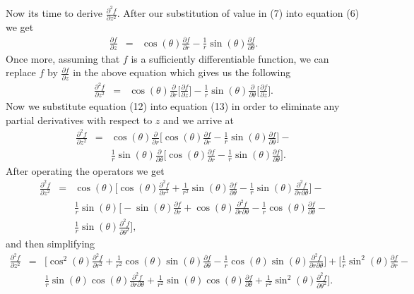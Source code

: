 \documentclass[12pt]{article}
\begin{document}
Now its time to derive $\frac{{\partial}^2 f}{\partial z^2}$. After our substitution of value in (7) into equation (6) we get
\begin{eqnarray}
\frac{\partial f}{\partial z} &=& \cos(\theta)\frac{\partial f}{\partial r} - \frac{1}{r}\sin(\theta)\frac{\partial f}{\partial\theta}.
\end{eqnarray}
Once more, assuming that $f$ is a sufficiently differentiable function, we can replace $f$ by $\frac{\partial f}{\partial z}$ in the above equation which gives us the following 
\begin{eqnarray}
\frac{{\partial}^2 f}{\partial z^2} &=& \cos(\theta)\frac{\partial}{\partial r}\Big[\frac{\partial f}{\partial z}\Big] - \frac{1}{r}\sin(\theta)\frac{\partial}{\partial\theta}\Big[\frac{\partial f}{\partial z}\Big].
\end{eqnarray}
Now we substitute equation (12) into equation (13) in order to eliminate any partial derivatives with respect to $z$ and we arrive at
\begin{eqnarray*}
\frac{{\partial}^2 f}{\partial z^2} &=& \cos(\theta)\frac{\partial}{\partial r}\Big[\cos(\theta)\frac{\partial f}{\partial r} - \frac{1}{r}\sin(\theta)\frac{\partial f}{\partial\theta}\Big] - \\
& & \frac{1}{r}\sin(\theta)\frac{\partial}{\partial\theta}\Big[\cos(\theta)\frac{\partial f}{\partial r} - \frac{1}{r}\sin(\theta)\frac{\partial f}{\partial\theta}\Big].
\end{eqnarray*}
After operating the operators we get
\begin{eqnarray*}
\frac{{\partial}^2 f}{\partial z^2} &=& \cos(\theta)\Big[\cos(\theta)\frac{{\partial}^2 f}{\partial r^2} + \frac{1}{r^2}\sin(\theta)\frac{\partial f}{\partial\theta} - \frac{1}{r}\sin(\theta)\frac{{\partial}^2 f}{\partial r \partial\theta}\Big] - \\
& & \frac{1}{r}\sin(\theta)\Big[-\sin(\theta)\frac{\partial f}{\partial r} + \cos(\theta)\frac{{\partial}^2 f}{\partial r \partial\theta} - \frac{1}{r}\cos(\theta)\frac{\partial f}{\partial\theta} - \\
& & \frac{1}{r}\sin(\theta)\frac{{\partial}^2 f}{\partial{\theta}^2}\Big],
\end{eqnarray*}
and then simplifying
\begin{eqnarray*}
\frac{{\partial}^2 f}{\partial z^2} &=& \Big[{\cos}^2(\theta)\frac{{\partial}^2 f}{\partial r^2} + \frac{1}{r^2}\cos(\theta)\sin(\theta)\frac{\partial f}{\partial\theta} - \frac{1}{r}\cos(\theta)\sin(\theta)\frac{{\partial}^2 f}{\partial r \partial\theta}\Big] + \Big[\frac{1}{r}{\sin}^2(\theta)\frac{\partial f}{\partial r} - \\
& & \frac{1}{r}\sin(\theta)\cos(\theta)\frac{{\partial}^2 f}{\partial r \partial
\theta} + \frac{1}{r^2}\sin(\theta)\cos(\theta)\frac{\partial f}{\partial\theta} + \frac{1}{r^2}{\sin}^2(\theta)\frac{{\partial}^2 f}{\partial{\theta}^2}\Big].
\end{eqnarray*}
\end{document}
